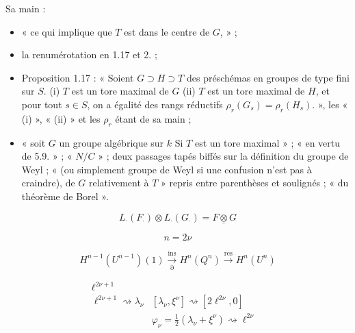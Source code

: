 \documentclass[11pt,a4paper]{article}
\begin{document}
Sa main :
\begin{itemize}
  \item « ce qui implique que $T$ est dans le centre de $G$,   »
   ;
  \item la renumérotation en 1.17 et 2. ;
  \item Proposition 1.17 : « Soient $G \supset H \supset T$ des préschémas en
  groupes de type fini sur $S$.  
  (i) $T$ est un tore maximal de $G$ (ii) $T$ est un
  tore maximal de $H$, et pour tout $s \in S$, on a égalité des rangs réductifs
  $\rho_r(G_s) = \rho_r(H_s)$. »,
  les « (i) », « (ii) » et les $\rho_r$ étant de sa main ;
  \item « soit $G$ un groupe algébrique sur $k$ Si $T$ est un tore maximal » ; « en vertu de  5.9. » ;
  «  $N/C$ » ; deux passages tapés biffés sur la définition du
  groupe de Weyl ; « (ou simplement groupe de Weyl si une confusion n'est pas à
  craindre), de $G$ relativement à $T$ » repris entre parenthèses et
  soulignés ; « du théorème de  Borel ».
\end{itemize}




\[
  L_{\cdot}(F_{\cdot}) \otimes L_{\cdot}(G_{\cdot}) = F \mathbin{\underline{\otimes}} G
\]

\[
  n = 2\nu
\]

\[
  H^{n-1}(U^{n-1})(1) \xrightarrow[\partial]{\text{ins}} H^n(Q^n)
  \xrightarrow{\text{res}} H^n(U^n)
\]

\[
  \begin{array}{lll}
    \ell^{2\nu+1} & & \\
    \ell^{2\nu+1} \rightsquigarrow \lambda_{\nu} &
    [\lambda_{\nu}, \xi^{\nu}] \rightsquigarrow [2\ell^{2\nu}, 0] & \\
     & \varphi_{\nu} = \tfrac12 (\lambda_{\nu} + \xi^{\nu}) \rightsquigarrow \ell^{2\nu} &
  \end{array}
\]
\end{document}
